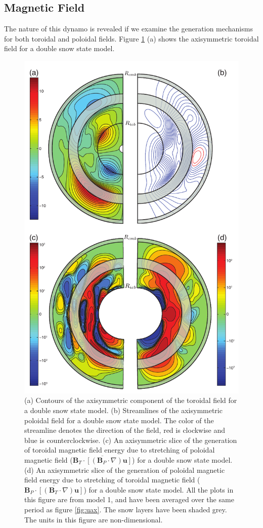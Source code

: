 \subsection{Magnetic Field}
The nature of this dynamo is revealed if we examine the generation mechanisms for both toroidal and poloidal fields. Figure \ref{fig:maggen} (a) shows the axisymmetric toroidal field for a double snow state model.
%
\begin{figure}
	\centering
	\noindent\includegraphics[width=.7\linewidth]{Chapter4/figures/aximaggen}
	\caption{(a) Contours of the axisymmetric component of the toroidal field for a double snow state model. (b) Streamlines of the axisymmetric poloidal field for a double snow state model. The color of the streamline denotes the direction of the field, red is clockwise and blue is counterclockwise. (c) An axisymmetric slice of the generation of toroidal magnetic field energy due to stretching of poloidal magnetic field ($\overline{\mathbf{B}_{T}\cdot\left[\left(\mathbf{B}_{P}\cdot\nabla\right)\mathbf{u}\right]}$) for a double snow state model. (d) An axisymmetric slice of the generation of poloidal magnetic field energy due to stretching of toroidal magnetic field ($\overline{\mathbf{B}_{P}\cdot\left[\left(\mathbf{B}_{T}\cdot\nabla\right)\mathbf{u}\right]}$) for a double snow state model. All the plots in this figure are from model 1, and have been averaged over the same period as figure \ref{fig:uax}. The snow layers have been shaded grey. The units in this figure are non-dimensional.}
	\label{fig:maggen}
\end{figure}
